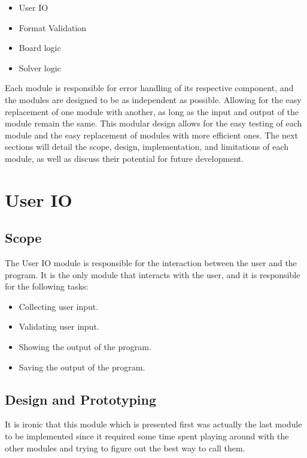 \documentclass[11pt]{article}
\begin{document}
\begin{itemize}
    \item User IO
    \item Format Validation
    \item Board logic
    \item Solver logic
\end{itemize}
Each module is responsible for error handling of its respective component, and the modules are designed to be as independent as possible. Allowing for the easy replacement of one module with another, as long as the input and output of the module remain the same. This modular design allows for the easy testing of each module and the easy replacement of modules with more efficient ones. The next sections will detail the scope, design, implementation, and limitations of each module, as well as discuss their potential for future development.

\section{User IO}
\subsection{Scope}
The User IO module is responsible for the interaction between the user and the program. It is the only module that interacts with the user, and it is responsible for the following tasks:
\begin{itemize}
    \item Collecting user input.
    \item Validating user input.
    \item Showing the output of the program.
    \item Saving the output of the program.
\end{itemize}

\subsection{Design and Prototyping}
It is ironic that this module which is presented first was actually the last module to be implemented since it required some time spent playing around with the other modules and trying to figure out the best way to call them.
\end{document}
